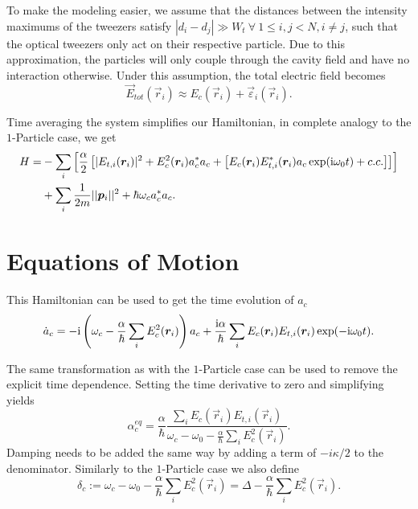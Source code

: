 To make the modeling easier, 
    we assume that the distances between the intensity maximums of the tweezers satisfy $|d_i - d_j| \gg W_t~\forall~1\leq i,j <N,i\neq j$,
    such that the optical tweezers only act on their respective particle.
Due to this approximation, the particles will only couple through the cavity field
    and have no interaction otherwise.
Under this assumption, the total electric field becomes
\begin{equation}
    \vec E_{tot}(\vec r_i) \approx E_c(\vec r_i) + \vec \varepsilon_i(\vec r_i).
\end{equation}

Time averaging the system simplifies our Hamiltonian, 
    in complete analogy to the $1$-Particle case, we get
\begin{equation}
\begin{split}
    H = &-\sum_i  \left[
         \frac{\alpha}{2} \left[ 
            |E_{t,i}(\bm{r}_i)|^2 
            + E_c^2(\bm{r}_i)  a_c^* a_c + \left[ 
                E_c(\bm{r}_i) E_{t,i}^*(\bm{r}_i) a_c \exp(\mathrm{i}\omega_0t) + c.c. 
            \right]
        \right]
    \right] \\
       &+\sum_i\frac{1}{2m} ||\bm{p}_i||^2 + \hbar\omega_c a_c^* a_c.
\end{split}
\end{equation}

\section{Equations of Motion}

This Hamiltonian can be used to get the time evolution of $a_c$
\begin{equation}
\dot a_c = -\mathrm{i} \left( \omega_c - \frac\alpha\hbar \sum_i E_c^2(\bm{r}_i)\right)a_c + \frac{\mathrm{i}\alpha}\hbar \sum_iE_c(\bm{r}_i)E_{t,i}(\bm{r}_i) \exp(-\mathrm{i}\omega_0 t).
\end{equation}

The same transformation as with the $1$-Particle case can be used to remove the explicit time dependence.
Setting the time derivative to zero and simplifying yields
\begin{equation}
    \alpha_c^{eq} = \frac\alpha\hbar \frac{\sum_i E_c(\vec r_i) E_{t,i}(\vec r_i)}{\omega_c-\omega_0-\frac\alpha\hbar \sum_i E_c^2(\vec r_i)}.
\end{equation}
Damping needs to be added the same way by adding a term of $- i\kappa/2$ to the denominator.
Similarly to the $1$-Particle case we also define 
\begin{equation}
    \delta_c := \omega_c - \omega_0 - \frac\alpha\hbar \sum_i E_c^2(\vec r_i) = \Delta - \frac\alpha\hbar \sum_i E_c^2(\vec r_i).
\end{equation}

